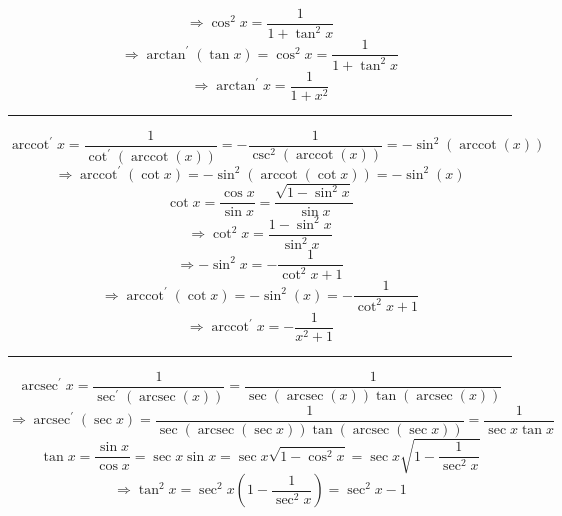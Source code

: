 \documentclass[a0paper,landscape,fleqn]{article}
\DeclareMathOperator{\arccot}{arccot}
\DeclareMathOperator{\arcsec}{arcsec}
\begin{document}
\begin{equation*}\Rightarrow\cos^2 x=\frac{1}{1+\tan^2 x}\end{equation*}
\begin{equation*}
\Rightarrow\arctan^\prime (\tan x)
=\cos^2 x
=\frac{1}{1+\tan^2 x}
\end{equation*}
\begin{equation*}
\Rightarrow\arctan^\prime x
=\frac{1}{1+x^2}
\end{equation*}
\hrule%
\begin{equation*}
\arccot^\prime x
=\frac{1}{\cot^\prime(\arccot(x))}
=-\frac{1}{\csc^2(\arccot(x))}
=-\sin^2(\arccot(x))
\end{equation*}
\begin{equation*}
\Rightarrow\arccot^\prime(\cot x)
=-\sin^2(\arccot(\cot x))
=-\sin^2(x)
\end{equation*}
\begin{equation*}
\cot x
=\frac{\cos x}{\sin x}
=\frac{\sqrt{1-\sin^2 x}}{\sin x}
\end{equation*}
\begin{equation*}
\Rightarrow\cot^2 x
=\frac{1-\sin^2 x}{\sin^2 x}
\end{equation*}
\begin{equation*}
\Rightarrow-\sin^2 x
=-\frac{1}{\cot^2 x+1}
\end{equation*}
\begin{equation*}
\Rightarrow\arccot^\prime(\cot x)
=-\sin^2(x)
=-\frac{1}{\cot^2 x+1}
\end{equation*}
\begin{equation*}
\Rightarrow\arccot^\prime x
=-\frac{1}{x^2+1}
\end{equation*}
\hrule%
\begin{equation*}
\arcsec^\prime x
=\frac{1}{\sec^\prime(\arcsec(x))}
=\frac{1}{\sec(\arcsec(x))\tan(\arcsec(x))}
\end{equation*}
\begin{equation*}
\Rightarrow\arcsec^\prime(\sec x)
=\frac{1}{\sec(\arcsec(\sec x))\tan(\arcsec(\sec x))}
=\frac{1}{\sec x\tan x}
\end{equation*}
\begin{equation*}
\tan x
=\frac{\sin x}{\cos x}
=\sec x\sin x
=\sec x\sqrt{1-\cos^2 x}
=\sec x\sqrt{1-\frac{1}{\sec^2 x}}
\end{equation*}
\begin{equation*}
\Rightarrow\tan^2 x
=\sec^2 x\left(1-\frac{1}{\sec^2 x}\right)
=\sec^2 x-1
\end{equation*}
\end{document}
